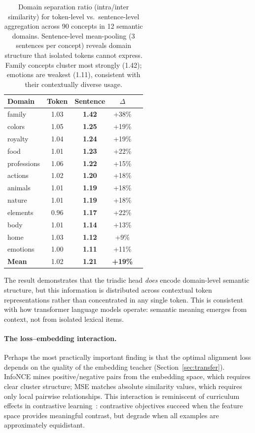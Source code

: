 \documentclass[11pt,a4paper]{article}
\begin{document}
\begin{table}[h]
\centering
\small
\begin{tabular}{lcccc}
\toprule
\textbf{Domain} & \textbf{Token} & \textbf{Sentence} & \textbf{$\Delta$} \\
\midrule
family      & 1.03 & \textbf{1.42} & +38\% \\
colors      & 1.05 & \textbf{1.25} & +19\% \\
royalty     & 1.04 & \textbf{1.24} & +19\% \\
food        & 1.01 & \textbf{1.23} & +22\% \\
professions & 1.06 & \textbf{1.22} & +15\% \\
actions     & 1.02 & \textbf{1.20} & +18\% \\
animals     & 1.01 & \textbf{1.19} & +18\% \\
nature      & 1.01 & \textbf{1.19} & +18\% \\
elements    & 0.96 & \textbf{1.17} & +22\% \\
body        & 1.01 & \textbf{1.14} & +13\% \\
home        & 1.03 & \textbf{1.12} & +9\%  \\
emotions    & 1.00 & \textbf{1.11} & +11\% \\
\midrule
\textbf{Mean} & 1.02 & \textbf{1.21} & \textbf{+19\%} \\
\bottomrule
\end{tabular}
\caption{Domain separation ratio (intra/inter similarity) for token-level vs.\ sentence-level
aggregation across 90 concepts in 12 semantic domains. Sentence-level mean-pooling (3 sentences
per concept) reveals domain structure that isolated tokens cannot express. Family concepts
cluster most strongly (1.42); emotions are weakest (1.11), consistent with their contextually
diverse usage.}
\label{tab:sentence_agg}
\end{table}

The result demonstrates that the triadic head \emph{does} encode domain-level semantic structure,
but this information is distributed across contextual token representations rather than
concentrated in any single token. This is consistent with how transformer language models
operate: semantic meaning emerges from context, not from isolated lexical items.

\paragraph{The loss--embedding interaction.}
Perhaps the most practically important finding is that the optimal alignment loss depends on the quality of the embedding teacher (Section~\ref{sec:transfer}). InfoNCE mines positive/negative pairs from the embedding space, which requires clear cluster structure; MSE matches absolute similarity values, which requires only local pairwise relationships. This interaction is reminiscent of curriculum effects in contrastive learning~\citep{oord2018cpc}: contrastive objectives succeed when the feature space provides meaningful contrast, but degrade when all examples are approximately equidistant.
\end{document}
